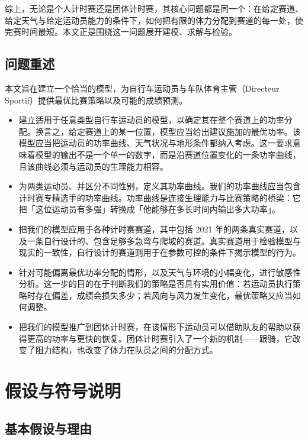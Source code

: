 \documentclass[11pt,a4paper]{ctexart}
\begin{document}
综上，无论是个人计时赛还是团体计时赛，其核心问题都是同一个：在给定赛道、给定天气与给定运动员能力的条件下，如何把有限的体力分配到赛道的每一处，使完赛时间最短。本文正是围绕这一问题展开建模、求解与检验。

\subsection{问题重述}

本文旨在建立一个恰当的模型，为自行车运动员与车队体育主管（Directeur Sportif）提供最优比赛策略以及可能的成绩预测。

\begin{itemize}
\item 建立适用于任意类型自行车运动员的模型，以确定其在整个赛道上的功率分配。换言之，给定赛道上的某一位置，模型应当给出建议施加的最优功率。该模型应当把运动员的功率曲线、天气状况与地形条件都纳入考虑。这一要求意味着模型的输出不是一个单一的数字，而是沿赛道位置变化的一条功率曲线，且该曲线必须与运动员的生理能力相容。
\item 为两类运动员、并区分不同性别，定义其功率曲线。我们的功率曲线应当包含计时赛专精选手的功率曲线。功率曲线是连接生理能力与比赛策略的桥梁：它把「这位运动员有多强」转换成「他能够在多长时间内输出多大功率」。
\item 把我们的模型应用于各种计时赛赛道，其中包括 2021 年的两条真实赛道，以及一条自行设计的、包含足够多急弯与爬坡的赛道。真实赛道用于检验模型与现实的一致性，自行设计的赛道则用于在参数可控的条件下揭示模型的行为。
\item 针对可能偏离最优功率分配的情形，以及天气与环境的小幅变化，进行敏感性分析。这一步的目的在于判断我们的策略是否具有实用价值：若运动员执行策略时存在偏差，成绩会损失多少；若风向与风力发生变化，最优策略又应当如何调整。
\item 把我们的模型推广到团体计时赛，在该情形下运动员可以借助队友的帮助以获得更高的功率与更快的恢复。团体计时赛引入了一个新的机制——跟骑，它改变了阻力结构，也改变了体力在队员之间的分配方式。
\end{itemize}

\section{假设与符号说明}

\subsection{基本假设与理由}
\end{document}
